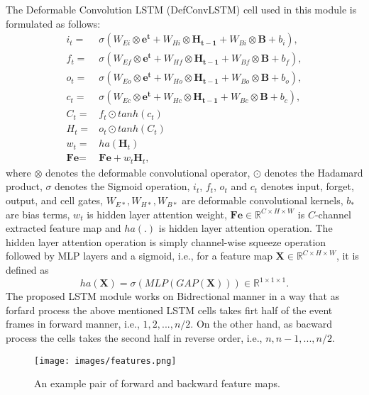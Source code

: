 \documentclass{article}
\begin{document}
The Deformable Convolution LSTM (DefConvLSTM) cell used in this module is formulated as follows: 
\begin{align}
 i_t =& \sigma \left ( W_{Ei}  \otimes \mathbf{e^t} +W_{Hi} \otimes \mathbf{H_{t-1}} + W_{Bi} \otimes \mathbf{B}  + b_i \right ),\\
 f_t =& \sigma \left ( W_{Ef}  \otimes \mathbf{e^t} +W_{Hf} \otimes \mathbf{H_{t-1}} + W_{Bf} \otimes \mathbf{B} + b_f \right ),\\
 o_t =& \sigma \left ( W_{Eo}  \otimes \mathbf{e^t} +W_{Ho} \otimes \mathbf{H_{t-1}} + W_{Bo} \otimes \mathbf{B} + b_o \right ),\\
 c_t =& \sigma \left ( W_{Ec}  \otimes \mathbf{e^t} +W_{Hc} \otimes \mathbf{H_{t-1}} + W_{Bc} \otimes \mathbf{B} + b_c \right ),\\
 C_t =& f_t \odot tanh \left ( c_t \right ) \\
 H_t =& o_t \odot tanh \left ( C_t \right ) \\
 w_t =& ha \left ( \textbf{H}_t \right ) \\ 
 \textbf{Fe} =& \mathbf{Fe} + w_t\mathbf{H}_t, 
\end{align}
where $\otimes$ denotes the deformable convolutional operator, $\odot$ denotes the
Hadamard product, $\sigma$ denotes the Sigmoid operation, $i_t$, $f_t$, $o_t$ and
$c_t$ denotes input, forget, output, and cell gates, $W_{E*}, W_{H*}, W_{B*}$ are
deformable convolutional kernels, $b_*$ are bias terms, $w_t$ is hidden layer attention weight, 
$\mathbf{Fe }\in \mathbb{R}^{C \times H \times W}$ is $C$-channel
extracted feature map and $ha(.)$ is hidden layer attention operation. The hidden layer attention
operation is simply channel-wise squeeze operation followed by MLP layers and a sigmoid, i.e.,
for a feature map $\mathbf{X }\in \mathbb{R}^{C \times H \times W}$, it is defined as
\begin{equation}
 ha (\mathbf{X}) = \sigma \left ( MLP \left ( GAP \left ( \mathbf{X} \right ) \right ) \right ) \in \mathbb{R}^{1 \times 1 \times 1}. \label{MLP}
\end{equation}
The proposed LSTM module works on Bidrectional manner in a way that as forfard
process the above mentioned LSTM cells takes firt half of the event frames in 
forward manner, i.e., $1, 2, ..., n/2$. On the other hand, as bacward process the 
cells takes the second half in reverse order, i.e., $n, n-1,..., n/2$.

\begin{figure}[ht]
\centering
\texttt{[image: images/features.png]}
\caption{An example pair of forward and backward feature maps.}
\label{fig:resultsReblur}
\end{figure}
\end{document}
